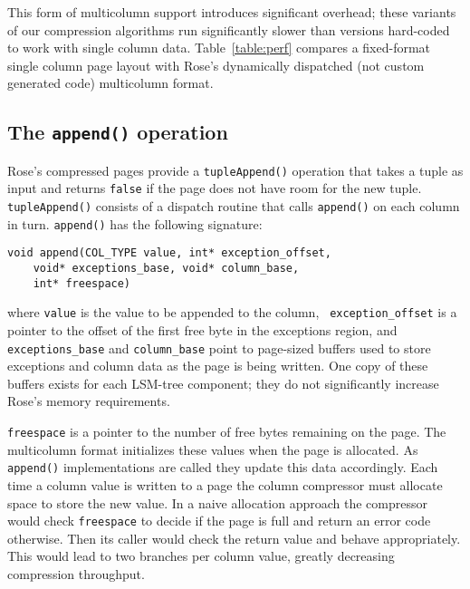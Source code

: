 \documentclass{vldb}
\newcommand{\rowss}{Rose's\xspace}
\begin{document}
This form of multicolumn support introduces significant overhead;
these variants of our compression algorithms run significantly slower
than versions hard-coded to work with single column data.
Table~\ref{table:perf} compares a fixed-format single column page
layout with \rowss dynamically dispatched (not custom generated code)
multicolumn format.


\subsection{The {\tt \large append()} operation}

\rowss compressed pages provide a {\tt tupleAppend()} operation that
takes a tuple as input and returns {\tt false} if the page does not have
room for the new tuple.  {\tt tupleAppend()} consists of a dispatch
routine that calls {\tt append()} on each column in turn.
{\tt append()} has the
following signature:
\begin{verbatim}
void append(COL_TYPE value, int* exception_offset,
    void* exceptions_base, void* column_base,
    int* freespace)
\end{verbatim}
where {\tt value} is the value to be appended to the column, {\tt
  exception\_offset} is a pointer to the offset of the first free byte in the
exceptions region, and {\tt exceptions\_base} and {\tt column\_base} point
to page-sized buffers used to store exceptions and column data as
the page is being written.  One copy of these buffers exists for
each LSM-tree component; they do not significantly increase \rowss memory
requirements.

{\tt freespace} is a pointer to the number of free bytes
remaining on the page.  The multicolumn format initializes these
values when the page is allocated.  As {\tt append()} implementations
are called they update this data accordingly.  Each time a column
value is written to a page the column compressor must allocate
space to store the new value.  In a naive allocation approach
the compressor would check {\tt freespace} to decide if the page is full
and return an error code otherwise.  Then its caller would check the
return value and behave appropriately.  This would lead to two branches
per column value, greatly decreasing compression throughput.
\end{document}
